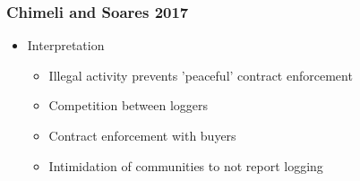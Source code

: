 \documentclass[xcolor=x11names,compress]{beamer}\usepackage[]{graphicx}\usepackage[]{color}
\renewcommand{\(}{\begin{columns}}
\renewcommand{\)}{\end{columns}}
\newcommand{\<}[1]{\begin{column}{#1}}
\renewcommand{\>}{\end{column}}
\begin{document}
\begin{frame}
\frametitle{Chimeli and Soares 2017}
\begin{itemize}
\item Interpretation
\pause
\begin{itemize}
\item Illegal activity prevents 'peaceful' contract enforcement
\item Competition between loggers
\item Contract enforcement with buyers
\item Intimidation of communities to not report logging
\end{itemize}
\end{itemize}
\end{frame}
\end{document}

